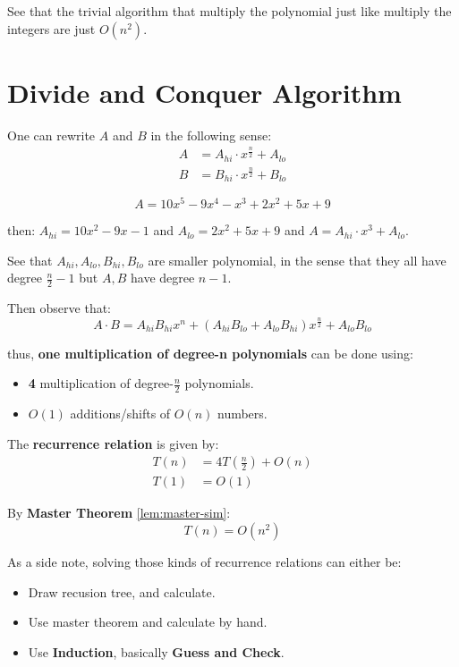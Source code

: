 See that the trivial algorithm that multiply the polynomial just like multiply the integers are just \( O(n^2) \).

\section{Divide and Conquer Algorithm}

One can rewrite \( A \) and \( B \) in the following sense:
\[
  \begin{aligned}
    A&= A_{hi}\cdot x^{\frac{n}{2}} + A_{lo} \\ 
    B&= B_{hi}\cdot x^{\frac{n}{2}} + B_{lo}
  \end{aligned}
\] 

\begin{eg}
  \leavevmode
  \[
    A = 10x^5 - 9x^4 -x^3 +2x^2 +5x+9 
  \] 

  then:
  \( A_{hi} = 10 x^2 - 9x -1 \) and \( A_{lo} = 2x^2 +5x + 9 \) and \( A = A_{hi}\cdot x^3 + A_{lo} \).
\end{eg}

See that \( A_{hi}, A_{lo}, B_{hi}, B_{lo} \) are smaller polynomial, in the sense that they all have degree \( \frac{n}{2} - 1 \) but \( A,B \) have degree \( n-1 \).

Then observe that:
\[
  A\cdot B = A_{hi}B_{hi}x^n + (A_{hi}B_{lo} + A_{lo}B_{hi})x^{\frac{n}{2}} + A_{lo}B_{lo}
\] 

thus, \textbf{one multiplication of degree-n polynomials} can be done using:
\begin{itemize}
  \item \textbf{4} multiplication of degree-\( \frac{n}{2} \) polynomials.
  \item \( O(1) \) additions/shifts of \( O(n) \) numbers.
\end{itemize}

The \textbf{recurrence relation} is given by:
\[
  \begin{aligned}
    T(n) &= 4T(\frac{n}{2}) + O(n) \\ 
    T(1) &= O(1)
  \end{aligned}
\] 

By \textbf{Master Theorem} \ref{lem:master-sim}:
\[
  T(n) = O(n^2)
\] 

\begin{note}
  As a side note, solving those kinds of recurrence relations can either be:
  \begin{itemize}
    \item Draw recusion tree, and calculate.
    \item Use master theorem and calculate by hand.
    \item Use \textbf{Induction}, basically \textbf{Guess and Check}.
  \end{itemize}
\end{note}

